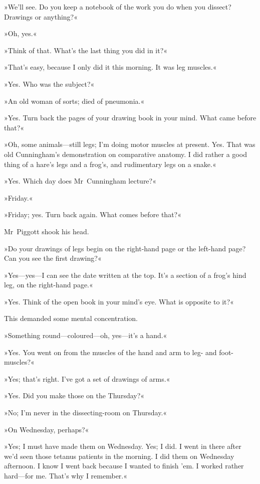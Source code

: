 »We'll see. Do you keep a notebook of the work you do when you dissect? Drawings or anything?«

»Oh, yes.«

»Think of that. What's the last thing you did in it?«

»That's easy, because I only did it this morning. It was leg muscles.«

»Yes. Who was the subject?«

»An old woman of sorts; died of pneumonia.«

»Yes. Turn back the pages of your drawing book in your mind. What came before that?«

»Oh, some animals—still legs; I'm doing motor muscles at present. Yes. That was old Cunningham's demonstration on comparative anatomy. I did rather a good thing of a hare's legs and a frog's, and rudimentary legs on a snake.«

»Yes. Which day does Mr~Cunningham lecture?«

»Friday.«

»Friday; yes. Turn back again. What comes before that?«

Mr~Piggott shook his head.

»Do your drawings of legs begin on the right-hand page or the left-hand page? Can you see the first drawing?«

»Yes—yes—I can see the date written at the top. It's a section of a frog's hind leg, on the right-hand page.«

»Yes. Think of the open book in your mind's eye. What is opposite to it?«

This demanded some mental concentration.

»Something round—coloured—oh, yes—it's a hand.«

»Yes. You went on from the muscles of the hand and arm to leg- and foot-muscles?«

»Yes; that's right. I've got a set of drawings of arms.«

»Yes. Did you make those on the Thursday?«

»No; I'm never in the dissecting-room on Thursday.«

»On Wednesday, perhaps?«

»Yes; I must have made them on Wednesday. Yes; I did. I went in there after we'd seen those tetanus patients in the morning. I did them on Wednesday afternoon. I know I went back because I wanted to finish 'em. I worked rather hard—for me. That's why I remember.«

